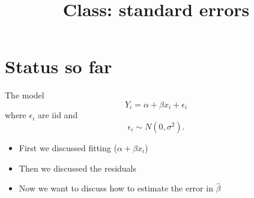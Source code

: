 \documentclass{article}
\begin{document}
\title{Class: standard errors}

\section{Status so far}

The model
\begin{displaymath}
Y_i = \alpha + \beta x_i + \epsilon_i 
\end{displaymath}
where $\epsilon_i$ are iid and
\begin{displaymath}
\epsilon_i \sim N(0,\sigma^2).
\end{displaymath}

\begin{itemize}
\item First we discussed fitting ($\alpha + \beta x_i$)
\item Then we discussed the residuals
\item Now we want to discuss how to estimate the error in $\hat\beta$
\end{itemize}

 
\end{document}
